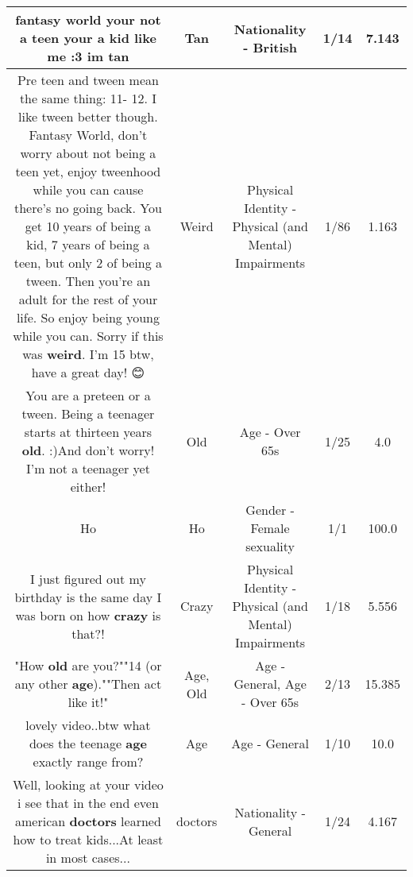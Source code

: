 \documentclass[11pt]{article}
\newlength\mylength
\begin{document}
\begin{center}
\begin{longtable}{|C{.65\mylength}|C{.30\mylength}|C{.12\mylength}|C{.12\mylength}|C{.12\mylength}|}
  \small fantasy world your not a teen your a kid like me :3 im tan\normalsize   & Tan & Nationality - British & 1/14 & 7.143 \\  \hline
  \small Pre teen and tween mean the same thing: 11- 12. I like tween better though. Fantasy World, don't worry about not being a teen yet, enjoy tweenhood while you can cause there's no going back. You get 10 years of being a kid, 7 years of being a teen, but only 2 of being a tween. Then you're an adult for the rest of your life. So enjoy being young while you can. Sorry if this was \textbf{weird}. I'm 15 btw, have a great day! 😊\normalsize   & Weird & Physical Identity - Physical (and Mental) Impairments & 1/86 & 1.163 \\  \hline
  \small You are a preteen or a tween. Being a teenager starts at thirteen years \textbf{old}. :)And don't worry! I'm not a teenager yet either!\normalsize   & Old & Age - Over 65s & 1/25 & 4.0 \\  \hline
  \small Ho\normalsize   & Ho & Gender - Female sexuality & 1/1 & 100.0 \\  \hline
  \small I just figured out my birthday is the same day I was born on how \textbf{crazy} is that?!\normalsize   & Crazy & Physical Identity - Physical (and Mental) Impairments & 1/18 & 5.556 \\  \hline
  \small "How \textbf{old} are you?""14 (or any other \textbf{age}).""Then act like it!"\normalsize   & Age, Old & Age - General, Age - Over 65s & 2/13 & 15.385 \\  \hline
  \small lovely video..btw what does the teenage \textbf{age} exactly range from?\normalsize   & Age & Age - General & 1/10 & 10.0 \\  \hline
  \small Well, looking at your video i see that in the end even american \textbf{doctors} learned how to treat kids...At least in most cases...\normalsize   & doctors & Nationality - General & 1/24 & 4.167 \\  \hline

\end{longtable}
\end{center}
\end{document}
